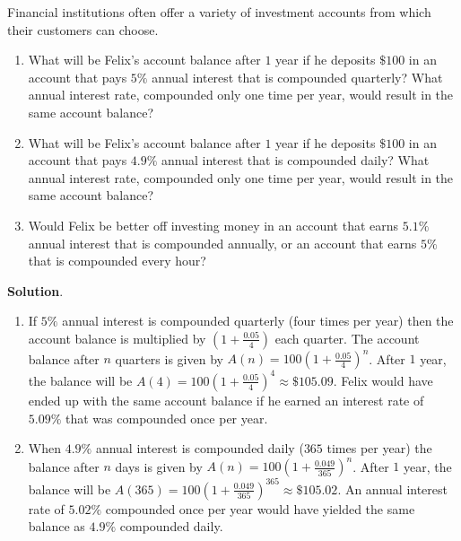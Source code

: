 \documentclass[10pt,]{book}
\theoremstyle{ptxdefinitionnotitle}
\theoremstyle{ptxdefinitiontitle}
\theoremstyle{ptxdefinitionnotitle}
\theoremstyle{ptxdefinitiontitle}
\theoremstyle{ptxdefinitionnotitle}
\theoremstyle{ptxdefinitiontitle}
\numberwithin{equation}{section}
\begin{document}
\begin{example}\label{chapter04-section05-investment-accounts}
\hypertarget{p-204}{}%
Financial institutions often offer a variety of investment accounts from which their customers can choose.%
\leavevmode%
\begin{enumerate}
\item\hypertarget{li-99}{}What will be Felix’s account balance after \(1\) year if he deposits \(\$100\) in an account that pays \(5\%\) annual interest that is compounded quarterly? What annual interest rate, compounded only one time per year, would result in the same account balance?%
\item\hypertarget{li-100}{}What will be Felix’s account balance after \(1\) year if he deposits \(\$100\) in an account that pays \(4.9\%\) annual interest that is compounded daily? What annual interest rate, compounded only one time per year, would result in the same account balance?%
\item\hypertarget{li-101}{}Would Felix be better off investing money in an account that earns \(5.1\%\) annual interest that is compounded annually, or an account that earns \(5\%\) that is compounded every hour?%
\end{enumerate}
\par\smallskip%
\noindent\textbf{Solution}.\hypertarget{solution-13}{}\quad%
\leavevmode%
\begin{enumerate}
\item\hypertarget{li-102}{}If \(5\%\) annual interest is compounded quarterly (four times per year) then the account balance is multiplied by \((1+\frac{0.05}{4})\) each quarter. The account balance after \(n\) quarters is given by \(A(n)=100(1+\frac{0.05}{4})^n\). After \(1\) year, the balance will be \(A(4)=100(1+\frac{0.05}{4})^4 \approx \$105.09\). Felix would have ended up with the same account balance if he earned an interest rate of \(5.09\%\) that was compounded once per year.%
\item\hypertarget{li-103}{}When \(4.9\%\) annual interest is compounded daily (\(365\) times per year) the balance after \(n\) days is given by  \(A(n)=100(1+\frac{0.049}{365})^n\). After \(1\) year, the balance will be \(A(365) = 100(1+\frac{0.049}{365})^{365} \approx \$105.02\). An annual interest rate of \(5.02\%\) compounded once per year would have yielded the same balance as \(4.9\%\) compounded daily.%

\end{enumerate}
\end{example}
\end{document}
